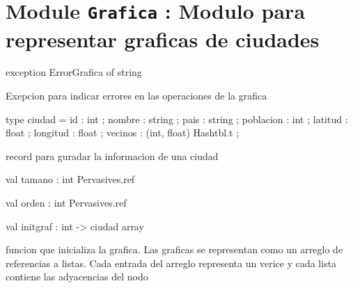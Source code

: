 \documentclass[11pt]{article}
\begin{document}
\section{Module {\tt{Grafica}} : Modulo para representar graficas de ciudades}
\label{module:Grafica}




\ocamldocvspace{0.5cm}



\label{exception:Grafica.ErrorGrafica}\begin{ocamldoccode}
exception ErrorGrafica of string
\end{ocamldoccode}
\begin{ocamldocdescription}
Exepcion para indicar errores en las operaciones de la grafica


\end{ocamldocdescription}




\label{type:Grafica.ciudad}\begin{ocamldoccode}
type ciudad = {}
  id : int ;
  nombre : string ;
  pais : string ;
  poblacion : int ;
  latitud : float ;
  longitud : float ;
  vecinos : (int, float) Hashtbl.t ;
{}
\end{ocamldoccode}
\begin{ocamldocdescription}
record para guradar la informacion de una ciudad


\end{ocamldocdescription}




\label{val:Grafica.tamano}\begin{ocamldoccode}
val tamano : int Pervasives.ref
\end{ocamldoccode}




\label{val:Grafica.orden}\begin{ocamldoccode}
val orden : int Pervasives.ref
\end{ocamldoccode}




\label{val:Grafica.initgraf}\begin{ocamldoccode}
val initgraf : int -> ciudad array
\end{ocamldoccode}
\begin{ocamldocdescription}
funcion que inicializa la grafica. Las graficas se representan como un arreglo de referencias
  a listas. Cada entrada del arreglo representa un verice y cada lista contiene las adyacencias
  del nodo


\end{ocamldocdescription}
\end{document}
